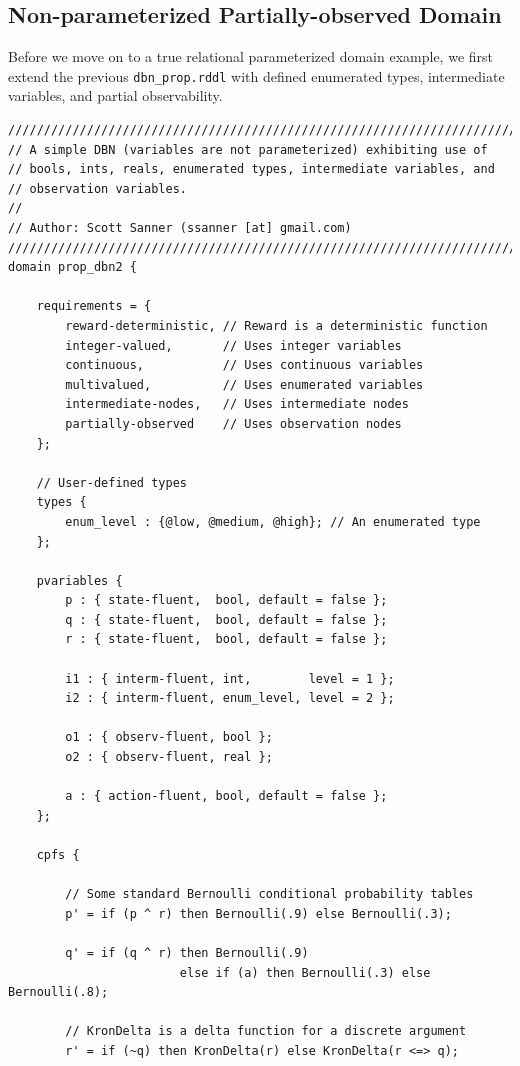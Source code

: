 \documentclass[11pt,a4paper]{article}
\begin{document}
\subsection{Non-parameterized Partially-observed Domain}

Before we move on to a true relational parameterized domain example, we
first extend the previous \texttt{dbn\_prop.rddl} with defined
enumerated types, intermediate variables, and partial observability.

\newpage
\begin{lstlisting}[title=dbn\_types\_interm\_po.rddl]
////////////////////////////////////////////////////////////////////////
// A simple DBN (variables are not parameterized) exhibiting use of
// bools, ints, reals, enumerated types, intermediate variables, and
// observation variables.
//
// Author: Scott Sanner (ssanner [at] gmail.com)
////////////////////////////////////////////////////////////////////////
domain prop_dbn2 {
  	
	requirements = { 
		reward-deterministic, // Reward is a deterministic function
		integer-valued,       // Uses integer variables
		continuous,           // Uses continuous variables
		multivalued,          // Uses enumerated variables
		intermediate-nodes,   // Uses intermediate nodes
		partially-observed    // Uses observation nodes 
	};
      	
	// User-defined types
	types {
		enum_level : {@low, @medium, @high}; // An enumerated type
	};

	pvariables { 
		p : { state-fluent,  bool, default = false };
		q : { state-fluent,  bool, default = false };
		r : { state-fluent,  bool, default = false };
		 
		i1 : { interm-fluent, int,        level = 1 };
		i2 : { interm-fluent, enum_level, level = 2 };
		
		o1 : { observ-fluent, bool };
		o2 : { observ-fluent, real };
		
		a : { action-fluent, bool, default = false }; 
	};
  
	cpfs {

		// Some standard Bernoulli conditional probability tables
		p' = if (p ^ r) then Bernoulli(.9) else Bernoulli(.3);
						
		q' = if (q ^ r) then Bernoulli(.9) 
						else if (a) then Bernoulli(.3) else Bernoulli(.8);

		// KronDelta is a delta function for a discrete argument
		r' = if (~q) then KronDelta(r) else KronDelta(r <=> q);
		

\end{lstlisting}
\end{document}
